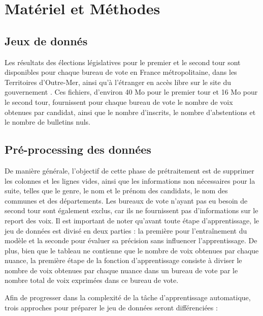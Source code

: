 \documentclass[11pt]{article}
\begin{document}
    \section{Matériel et Méthodes}

        \subsection*{Jeux de donnés}
            Les résultats des élections législatives pour le premier et le second tour sont disponibles pour chaque bureau de vote en France métropolitaine, dans les Territoires d'Outre-Mer, ainsi qu'à l'étranger en accès libre sur le site du gouvernement \cite{République_Française}. Ces fichiers, d'environ 40 Mo pour le premier tour et 16 Mo pour le second tour, fournissent pour chaque bureau de vote le nombre de voix obtenues par candidat, ainsi que le nombre d'inscrits, le nombre d'abstentions et le nombre de bulletins nuls.
        
        \subsection*{Pré-processing des données}
            De manière générale, l'objectif de cette phase de prétraitement est de supprimer les colonnes et les lignes vides, ainsi que les informations non nécessaires pour la suite, telles que le genre, le nom et le prénom des candidats, le nom des communes et des départements. Les bureaux de vote n'ayant pas eu besoin de second tour sont également exclus, car ils ne fournissent pas d'informations sur le report des voix. Il est important de noter qu'avant toute étape d'apprentissage, le jeu de données est divisé en deux parties : la première pour l'entraînement du modèle et la seconde pour évaluer sa précision sans influencer l'apprentissage. De plus, bien que le tableau ne contienne que le nombre de voix obtenues par chaque nuance, la première étape de la fonction d'apprentissage consiste à diviser le nombre de voix obtenues par chaque nuance dans un bureau de vote par le nombre total de voix exprimées dans ce bureau de vote.

            Afin de progresser dans la complexité de la tâche d'apprentissage automatique, trois approches pour préparer le jeu de données seront différenciées :
        
\end{document}
